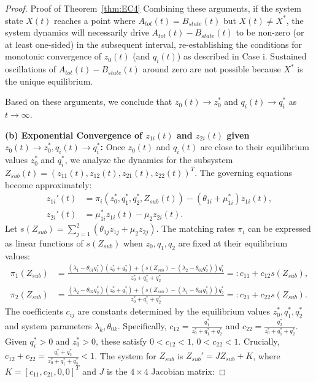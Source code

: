 \begin{proof}{Proof of Theorem~\ref{thm:EC4}}
    Combining these arguments, if the system state $X(t)$ reaches a point where $A_{tot}(t) = B_{state}(t)$ but $X(t) \neq X^*$, the system dynamics will necessarily drive $A_{tot}(t) - B_{state}(t)$ to be non-zero (or at least one-sided) in the subsequent interval, re-establishing the conditions for monotonic convergence of $z_0(t)$ (and $q_i(t)$) as described in Case i.
    Sustained oscillations of $A_{tot}(t) - B_{state}(t)$ around zero are not possible because $X^*$ is the unique equilibrium.

Based on these arguments, we conclude that $z_0(t) \to z_0^*$ and $q_i(t) \to q_i^*$ as $t \to \infty$.

\textbf{(b) Exponential Convergence of $z_{1i}(t)$ and $z_{2i}(t)$ given $z_0(t) \to z_0^*, q_i(t) \to q_i^*$:}
Once $z_0(t)$ and $q_i(t)$ are close to their equilibrium values $z_0^*$ and $q_i^*$, we analyze the dynamics for the subsystem $Z_{sub}(t) = (z_{11}(t), z_{12}(t), z_{21}(t), z_{22}(t))^T$.
The governing equations become approximately:
\begin{align*} 
    z_{1i}'(t) &= \pi_i(z_0^*, q_1^*, q_2^*, Z_{sub}(t)) - (\theta_{1i} + \mu_{1i}^*)z_{1i}(t), \\ 
    z_{2i}'(t) &= \mu_{1i}^*z_{1i}(t) - \mu_2z_{2i}(t). 
\end{align*}
Let $s(Z_{sub}) = \sum_{j=1}^{2}(\theta_{1j}z_{1j} + \mu_2z_{2j})$.
The matching rates $\pi_i$ can be expressed as linear functions of $s(Z_{sub})$ when $z_0, q_1, q_2$ are fixed at their equilibrium values:
\begin{align*} 
    \pi_1(Z_{sub}) &= \frac{(\lambda_1 - \theta_{01}q_1^*)(z_0^*+q_2^*) + (s(Z_{sub})-(\lambda_2 - \theta_{02}q_2^*))q_1^*}{z_0^* + q_1^* + q_2^*} =: c_{11} + c_{12}s(Z_{sub}), \\ 
    \pi_2(Z_{sub}) &= \frac{(\lambda_2 - \theta_{02}q_2^*)(z_0^*+q_1^*) + (s(Z_{sub})-(\lambda_1 - \theta_{01}q_1^*))q_2^*}{z_0^* + q_1^* + q_2^*} =: c_{21} + c_{22}s(Z_{sub}). 
\end{align*}
The coefficients $c_{ij}$ are constants determined by the equilibrium values $z_0^*, q_1^*, q_2^*$ and system parameters $\lambda_k, \theta_{0k}$. Specifically, $c_{12} = \frac{q_1^*}{z_0^*+q_1^*+q_2^*}$ and $c_{22} = \frac{q_2^*}{z_0^*+q_1^*+q_2^*}$. Given $q_i^* > 0$ and $z_0^* > 0$, these satisfy $0 < c_{12} < 1$, $0 < c_{22} < 1$. Crucially, $c_{12}+c_{22} = \frac{q_1^*+q_2^*}{z_0^*+q_1^*+q_2^*} < 1$.
The system for $Z_{sub}$ is $Z_{sub}' = J Z_{sub} + K$, where $K = [c_{11}, c_{21}, 0, 0]^T$ and $J$ is the $4 \times 4$ Jacobian matrix:

\end{proof}

